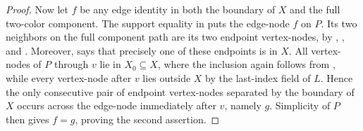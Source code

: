 \begin{proof}
Now let $f$ be any edge identity in both the boundary of $X$ and the full
two-color component.  The support equality in
 puts the edge-node $f$ on $P$.  Its two
neighbors on the full component path are its two endpoint vertex-nodes,
by , , and
.  Moreover,
 says that precisely one of these endpoints is in
$X$.  All vertex-nodes of $P$ through $v$ lie in $X_0\subseteq X$, where
the inclusion again follows from , while
every vertex-node after $v$ lies outside $X$ by the last-index field of
$L$.  Hence the only consecutive pair of endpoint vertex-nodes separated
by the boundary of $X$ occurs across the edge-node immediately after $v$,
namely $g$.  Simplicity of $P$ then gives $f=g$, proving the second
assertion.
\end{proof}
